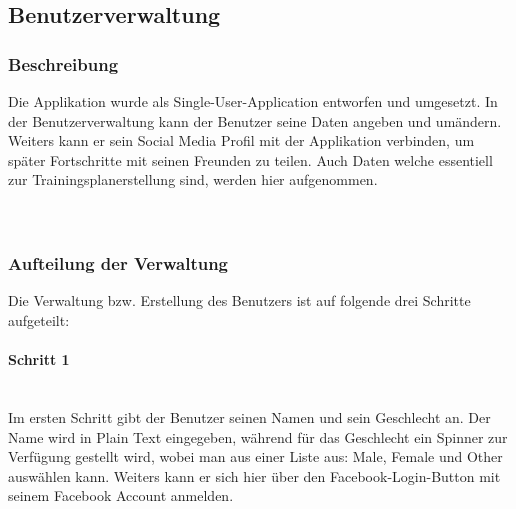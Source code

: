 \documentclass[FIPLY_base.tex]{subfiles}
\begin{document}
\subsection{Benutzerverwaltung}
\subsubsection{Beschreibung}
Die Applikation wurde als Single-User-Application entworfen und umgesetzt. In der Benutzerverwaltung kann der Benutzer seine
Daten angeben und umändern. Weiters kann er sein Social Media Profil mit der Applikation verbinden, um später Fortschritte mit seinen Freunden zu teilen.
Auch Daten welche essentiell zur Trainingsplanerstellung sind, werden hier aufgenommen.
\\\
\\\

\subsubsection{Aufteilung der Verwaltung}
Die Verwaltung bzw. Erstellung des Benutzers ist auf folgende drei Schritte aufgeteilt:

\paragraph{Schritt 1}\ \\
Im ersten Schritt gibt der Benutzer seinen Namen und sein Geschlecht an.
Der Name wird in Plain Text eingegeben, während für das Geschlecht ein Spinner zur Verfügung gestellt wird, wobei man aus einer Liste aus: Male, Female und Other auswählen kann.
Weiters kann er sich hier über den Facebook-Login-Button mit seinem Facebook Account anmelden.
\end{document}
